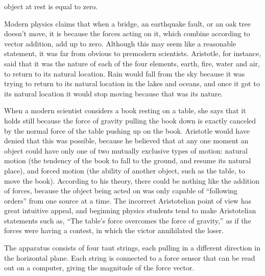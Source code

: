 \label{lab:force_vector_digital}

\apparatus
{}

object at rest is equal to zero.

\introduction

Modern physics claims that when a bridge, an earthquake
fault, or an oak tree doesn't move, it is because the forces
acting on it, which combine according to vector addition,
add up to zero.  Although this may seem like a reasonable
statement, it was far from obvious to premodern scientists. 
Aristotle, for instance, said that it was the nature of each
of the four elements, earth, fire, water and air, to return
to its natural location.  Rain would fall from the sky
because it was trying to return to its natural location in
the lakes and oceans, and once it got to its natural
location it would stop moving because that was its nature.

When a modern scientist considers a book resting on a table,
she says that it holds still because the force of gravity
pulling the book down is exactly canceled by the normal
force of the table pushing up on the book.  Aristotle would
have denied that this was possible, because he believed that
at any one moment an object could have only one of two
mutually exclusive types of motion: natural motion (the
tendency of the book to fall to the ground, and resume its
natural place), and forced motion (the ability of another
object, such as the table, to move the book).  According to
his theory, there could be nothing like the addition of
forces, because the object being acted on was only capable
of ``following orders''  from one source at a time.  The
incorrect Aristotelian point of view has great intuitive
appeal, and beginning physics students tend to make
Aristotelian statements such as, ``The table's force
overcomes the force of gravity,'' as if the forces were
having a contest, in which the victor annihilated the loser.


\observations

The apparatus consists of 
four taut strings, each pulling in a different direction
in the horizontal plane. Each string is connected to a force sensor
that can be read out on a computer, giving the magnitude of the
force vector.


